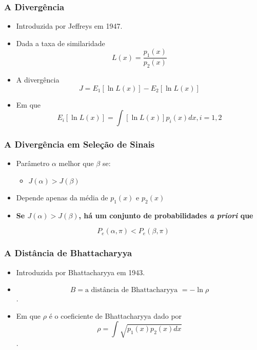 \documentclass{beamer}
\begin{document}
\begin{frame}
	\frametitle{A Divergência}

	\begin{itemize}
		\item Introduzida por Jeffreys em 1947.
		\item[] Dada a taxa de similaridade $$L(x) = \frac{p_1(x)}{p_2(x)}$$
		\item[] A divergência $$ J = E_1[\ln L(x)] - E_2[\ln L(x)]$$
		\item[] Em que $$E_i[\ln L(x)] = \int[\ln L(x)]p_i(x)dx, i = 1,2$$
	\end{itemize}	  
	
\end{frame}

\begin{frame}
	
	\frametitle{A Divergência em Seleção de Sinais}
	
	\begin{itemize}
		\setlength\itemsep{1em}
		\item Parâmetro $\alpha$ melhor que $\beta$ se:
		\begin{itemize}
			\item $J(\alpha) > J(\beta)$
		\end{itemize}		 
		
		\item Depende apenas da média de $p_1(x)$ e $p_2(x)$
		
		\item \textbf{Se $J(\alpha) > J(\beta)$, há um conjunto de probabilidades \textit{a priori} que}
	\end{itemize}
$$ P_e(\alpha,\pi) < P_e(\beta,\pi) $$	
	

  
\end{frame}

\begin{frame}

	\frametitle{A Distância de Bhattacharyya}
	
	\begin{itemize}
		\item Introduzida por Bhattacharyya em 1943.
		\item[] $$ B = \text{a distância de Bhattacharyya } = -\ln \rho $$ .
		\item[] Em que $\rho$ é o coeficiente de Bhattacharyya dado por $$\rho = \int \sqrt{p_1(x)p_2(x)dx}$$.
	\end{itemize}
\end{frame}
\end{document}
